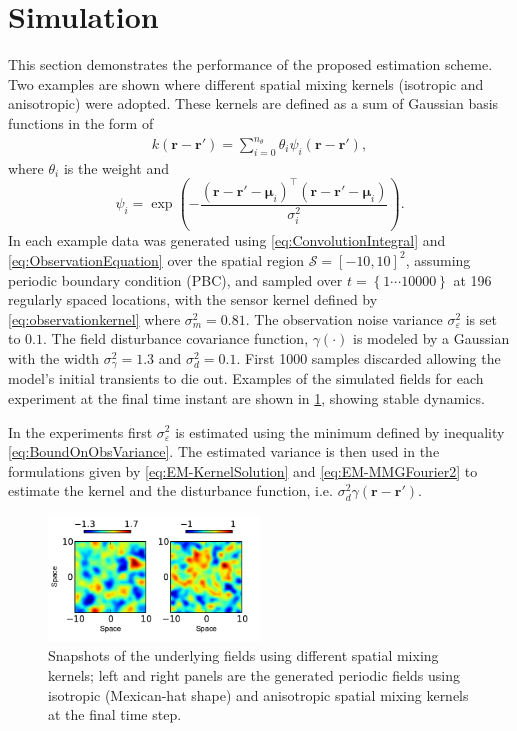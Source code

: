\documentclass[10pt,twocolumn,twoside]{IEEEtran}
\begin{document}
\section{Simulation}   
This section demonstrates the performance of the proposed estimation scheme. Two examples are shown where different spatial mixing kernels (isotropic and anisotropic) were adopted. These kernels are defined as a sum of Gaussian basis functions in the form of
\begin{align}\label{eq:sumofGaussians}
 k\left(\mathbf{r}-\mathbf{r}'\right)=\sum_{i=0}^{n_{\theta}}\theta_i\psi_i\left(\mathbf{r}-\mathbf{r}'\right), 
 \end{align}
where $\theta_i$ is the weight and
\begin{equation}\label{eq:Kernelbasis}
	\psi_i=\exp{\left(-\frac{(\mathbf{r}-\mathbf{r}'-\boldsymbol\mu_i)^\top(\mathbf{r}-\mathbf{r}'-\boldsymbol\mu_i)}{\sigma_i^2}\right)}.
\end{equation}
 In each example data was generated using \eqref{eq:ConvolutionIntegral} and \eqref{eq:ObservationEquation} over the spatial region $\mathcal{S}=[-10,10]^2 $, assuming periodic boundary condition (PBC), and sampled over $t=\left\lbrace1 \cdots 10000  \right\rbrace $ at 196 regularly spaced locations, with the sensor kernel defined by \eqref{eq:observationkernel} where $\sigma_m^2=0.81$. The observation noise variance $\sigma_{\varepsilon}^2$ is set to $0.1$. The field disturbance covariance function, $\gamma(\cdot)$ is modeled by a Gaussian with the width $\sigma_{\gamma}^2=1.3$ and $\sigma_d^2=0.1$. First 1000 samples discarded allowing the model's initial transients to die out. Examples of the simulated fields for each experiment at the final time instant are shown in \figurename{\ref{fig:field}}, showing stable dynamics. 

In the experiments first $\sigma_{\varepsilon}^2$ is estimated using the minimum defined by inequality \eqref{eq:BoundOnObsVariance}. The estimated variance is then used in the formulations given by \eqref{eq:EM-KernelSolution} and \eqref{eq:EM-MMGFourier2} to estimate the kernel and the disturbance function, i.e. $\sigma_d^2\gamma(\mathbf{r}-\mathbf{r'})$.
\begin{figure}[!h] 
 \centering
 \includegraphics[width=0.5\textwidth]{./Graph/FieldSnapshot.pdf}
 \caption{Snapshots of the underlying fields using different spatial mixing kernels; left and right panels are the generated periodic fields using isotropic (Mexican-hat shape) and anisotropic spatial mixing kernels at the final time step.}
 \label{fig:field}
 \end{figure} 
\end{document}
